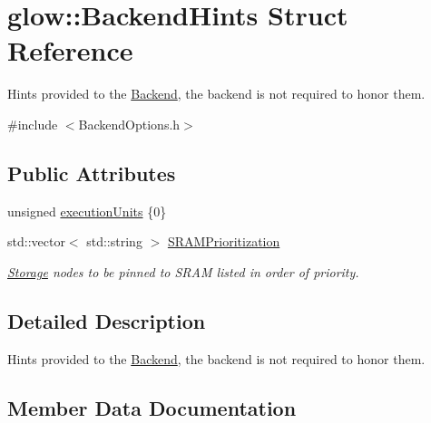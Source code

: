 \hypertarget{structglow_1_1_backend_hints}{}\section{glow\+:\+:Backend\+Hints Struct Reference}
\label{structglow_1_1_backend_hints}


Hints provided to the \hyperlink{classglow_1_1_backend}{Backend}, the backend is not required to honor them.  




{\ttfamily \#include $<$Backend\+Options.\+h$>$}

\subsection*{Public Attributes}
\begin{DoxyCompactItemize}
\item 
unsigned \hyperlink{structglow_1_1_backend_hints_ab3a9383ba7846d61d1e870e9a21ebc9e}{execution\+Units} \{0\}
\item 
\mbox{\label{structglow_1_1_backend_hints_af468212734eac6cc49023c2c585af8bb}} 
std\+::vector$<$ std\+::string $>$ \hyperlink{structglow_1_1_backend_hints_af468212734eac6cc49023c2c585af8bb}{S\+R\+A\+M\+Prioritization}
\begin{DoxyCompactList}\small\item\em \hyperlink{classglow_1_1_storage}{Storage} nodes to be pinned to S\+R\+AM listed in order of priority. \end{DoxyCompactList}\end{DoxyCompactItemize}


\subsection{Detailed Description}
Hints provided to the \hyperlink{classglow_1_1_backend}{Backend}, the backend is not required to honor them. 

\subsection{Member Data Documentation}
\mbox{\label{structglow_1_1_backend_hints_ab3a9383ba7846d61d1e870e9a21ebc9e}} 
